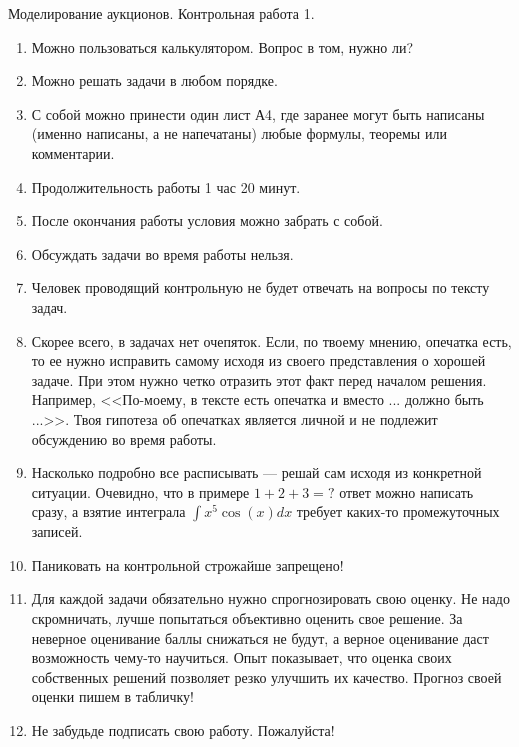 \documentclass[pdftex,12pt,a4paper]{article}
\begin{document}


\begin{Large}
Моделирование аукционов. Контрольная работа 1.
\end{Large}

\begin{enumerate}
\item Можно пользоваться калькулятором. Вопрос в том, нужно ли?
\item Можно решать задачи в любом порядке.
\item С собой можно принести один лист А4, где заранее могут быть написаны (именно написаны, а не напечатаны) любые формулы, теоремы или комментарии.
\item Продолжительность работы 1 час 20 минут.
\item После окончания работы условия можно забрать с собой.
\item Обсуждать задачи во время работы нельзя.
\item Человек проводящий контрольную не будет отвечать на вопросы по тексту задач. 
\item Скорее всего, в задачах нет очепяток. Если, по твоему мнению, опечатка есть, то ее нужно исправить самому исходя из своего представления о хорошей задаче. При этом нужно четко отразить этот факт перед началом решения. Например, <<По-моему, в тексте есть опечатка и вместо ... должно быть ...>>. Твоя гипотеза об опечатках является личной и не подлежит обсуждению во время работы.
\item Насколько подробно все расписывать --- решай сам исходя из конкретной ситуации. Очевидно, что в примере $ 1+2+3=? $ ответ можно написать сразу, а взятие интеграла $ \int x^{5}\cos(x)dx $ требует каких-то промежуточных записей.
\item Паниковать на контрольной строжайше запрещено!
\item Для каждой задачи обязательно нужно спрогнозировать свою оценку. Не надо скромничать, лучше попытаться объективно оценить свое решение.  За неверное оценивание баллы снижаться не будут, а верное оценивание даст возможность чему-то научиться. Опыт показывает, что оценка своих собственных решений позволяет резко улучшить их качество. Прогноз своей оценки пишем в табличку!
\item Не забудьде подписать свою работу. Пожалуйста!

\end{enumerate}
\end{document}
